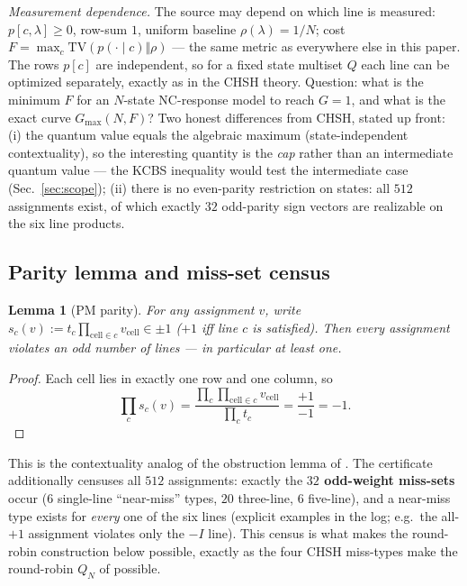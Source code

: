 \documentclass[aps,pra,reprint,superscriptaddress,floatfix]{revtex4-2}
\newcommand{\TV}{\mathrm{TV}}
\newtheorem{lemma}{Lemma}
\begin{document}
\emph{Measurement dependence.} The source may depend on which line is
measured: $p[c,\lambda]\ge 0$, row-sum $1$, uniform baseline
$\rho(\lambda)=1/N$; cost $F=\max_{c}\TV(p(\cdot\mid c)\Vert\rho)$ --- the
same metric as everywhere else in this paper. The rows $p[c]$ are
independent, so for a fixed state multiset $Q$ each line can be optimized
separately, exactly as in the {CHSH} theory. Question: what is the minimum
$F$ for an $N$-state NC-response model to reach $G=1$, and what is the
exact curve $G_{\max}(N,F)$? Two honest differences from {CHSH}, stated up
front: (i) the quantum value equals the algebraic maximum
(state-independent contextuality), so the interesting quantity is the
\emph{cap} rather than an intermediate quantum value --- the {KCBS}
inequality would test the intermediate case (Sec.~\ref{sec:scope});
(ii) there is no even-parity restriction on states: all $512$ assignments
exist, of which exactly $32$ odd-parity sign vectors are realizable on the
six line products.

\subsection{Parity lemma and miss-set census}

\begin{lemma}[PM parity]
\label{lem:pmparity}
For any assignment $v$, write $s_{c}(v):=t_{c}\prod_{\text{cell}\in
c}v_{\text{cell}}\in\pm 1$ ($+1$ iff line $c$ is satisfied). Then every
assignment violates an \emph{odd} number of lines --- in particular at
least one.
\end{lemma}

\begin{proof}
Each cell lies in exactly one row and one column, so
\begin{equation*}
\prod_{c}s_{c}(v)=\frac{\prod_{c}\prod_{\text{cell}\in c}v_{\text{cell}}}
{\prod_{c}t_{c}}=\frac{+1}{-1}=-1.
\end{equation*}
\end{proof}

This is the contextuality analog of the obstruction lemma of
\cite{mainpaper2026}. The certificate additionally censuses all $512$
assignments: exactly the \textbf{$32$ odd-weight miss-sets} occur ($6$
single-line ``near-miss'' types, $20$ three-line, $6$ five-line), and a
near-miss type exists for \emph{every} one of the six lines (explicit
examples in the log; e.g.\ the all-$+1$ assignment violates only the
$-I$ line). This census is what makes the round-robin construction
below possible, exactly as the four {CHSH} miss-types make the round-robin
$Q_{N}$ of \cite{mainpaper2026} possible.
\end{document}
